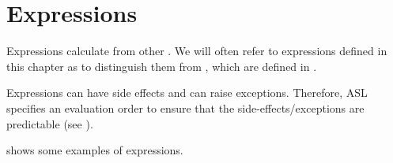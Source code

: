 \chapter{Expressions\label{chap:Expressions}}

\hypertarget{def-rhsexpression}{}
Expressions calculate \nativevaluesterm{} from other \nativevaluesterm{}.
We will often refer to expressions defined in this chapter as \rhsexpressions{} to distinguish them
from \assignableexpressions, which are defined in .

Expressions can have side effects and can raise exceptions.
Therefore, ASL specifies an evaluation order to ensure that the side-effects/exceptions are predictable (see ).

 shows some examples of expressions.

